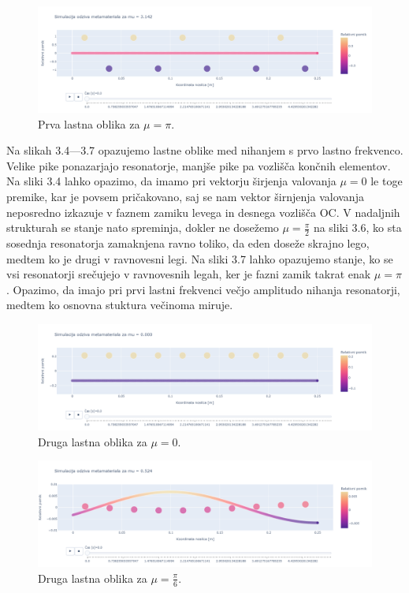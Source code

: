 \documentclass[12pt]{report}
\begin{document}
\begin{figure}[H]
  \centering
  \includegraphics[trim={0 4cm 0 3.5cm},clip, scale=0.3]{Images/Metamaterial_oblika_1_mu_3.142.png}
  \caption{Prva lastna oblika za $\mu = \pi$.}
\end{figure}
\noindent Na slikah 3.4---3.7 opazujemo lastne oblike med nihanjem s prvo lastno frekvenco. Velike pike ponazarjajo resonatorje, manjše pike pa vozlišča končnih elementov.
Na sliki 3.4 lahko opazimo, da imamo pri vektorju širjenja valovanja $\mu = 0$ le toge premike, kar je povsem pričakovano, saj se nam vektor širnjenja valovanja neposredno izkazuje v faznem zamiku levega in desnega
vozlišča \ac{OC}. V nadaljnih strukturah se stanje nato spreminja, dokler ne dosežemo $\mu = \frac{\pi}{2}$ na sliki 3.6, ko sta sosednja resonatorja zamaknjena ravno toliko, da eden doseže skrajno lego, medtem ko je drugi v ravnovesni legi.
Na sliki 3.7 lahko opazujemo stanje, ko se vsi resonatorji srečujejo v ravnovesnih legah, ker je fazni zamik takrat enak $\mu = \pi$. Opazimo, da imajo pri prvi lastni frekvenci večjo amplitudo nihanja resonatorji, medtem ko osnovna stuktura večinoma miruje.
\begin{figure}[H]
  \centering
  \includegraphics[trim={0 4cm 0 3.5cm},clip, scale=0.3]{Images/Metamaterial_oblika_2_mu_0.000.png}
  \caption{Druga lastna oblika za $\mu = 0$.}
\end{figure}
\begin{figure}[H]
  \centering
  \includegraphics[trim={0 4cm 0 3.5cm},clip, scale=0.3]{Images/Metamaterial_oblika_2_mu_0.524.png}
  \caption{Druga lastna oblika za $\mu = \frac{\pi}{6}$.}
\end{figure}
\end{document}
